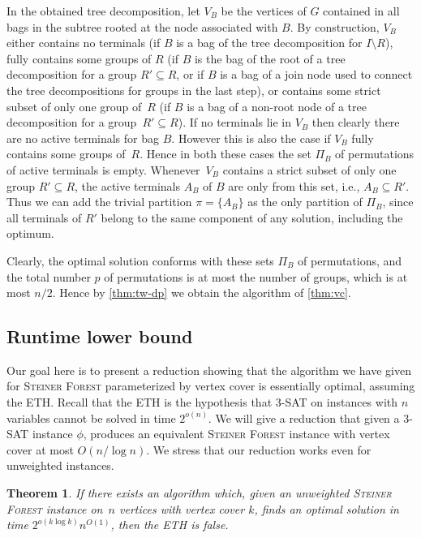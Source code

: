 \documentclass[a4paper]{article}
\theoremstyle{plain}
\newtheorem{theorem}{Theorem}%
\newcommand{\pname}[1]{\textsc{#1}}
\newcommand{\SF}{\pname{Steiner Forest}\xspace}
\begin{document}
In the obtained tree decomposition, let $V_B$ be the vertices of $G$ contained in all bags in the subtree rooted at the node associated with $B$. By construction, $V_B$ either contains no terminals 
(if $B$ is a bag of the tree decomposition for $I\setminus R$), 
fully contains some groups of $R$ (if $B$ is the bag of the root of a tree decomposition for a group $R'\subseteq R$, 
or if $B$ is a bag of a join node used to connect the tree decompositions for groups in the last step),
or contains some strict subset of only one group of~$R$
(if $B$ is a bag of a non-root node of a tree decomposition for a group~$R'\subseteq R$). 
If no terminals lie in $V_B$ then clearly there are no active terminals for bag $B$. 
However this is also the case if $V_B$ fully contains some groups of~$R$. Hence in both these cases
the set $\Pi_B$ of permutations of active terminals is empty. 
Whenever~$V_B$ contains a strict subset of only one group $R'\subseteq R$,
the active terminals $A_B$ of $B$ are only from this set, i.e., $A_B\subseteq R'$. Thus we can
add the trivial partition $\pi=\{A_B\}$ as the only partition of $\Pi_B$, since all terminals of $R'$ belong to the same component of any solution, including the optimum. 

Clearly, the optimal solution conforms with these sets $\Pi_B$ of permutations, and the total
number $p$ of permutations is at most the number of groups, which is at most $n/2$.
Hence by \autoref{thm:tw-dp} we obtain the algorithm of \autoref{thm:vc}.

%


\subsection{Runtime lower bound}

Our goal here is to present a reduction showing that the algorithm
we have given for \SF parameterized by vertex cover is essentially optimal,
assuming the ETH. Recall that the ETH is the hypothesis that \textsc{3-SAT} on
instances with $n$ variables cannot be solved in time $2^{o(n)}$. We will give
a reduction that given a \textsc{3-SAT} instance $\phi$, produces an equivalent
\SF instance with vertex cover at most $O(n/\log n)$. We stress that our
reduction works even for unweighted instances.


\begin{theorem} If there exists an algorithm which, given an unweighted \SF
instance on~$n$ vertices with vertex cover $k$, finds an optimal solution in
time $2^{o(k\log k)}n^{O(1)}$, then the ETH is false. \end{theorem}
\end{document}
